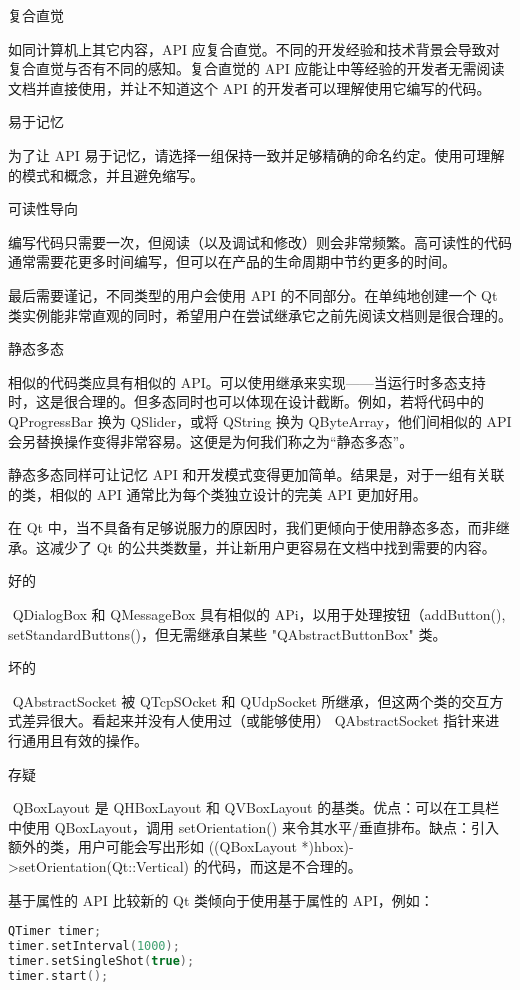 复合直觉

如同计算机上其它内容，API 应复合直觉。不同的开发经验和技术背景会导致对复合直觉与否有不同的感知。复合直觉的 API 应能让中等经验的开发者无需阅读文档并直接使用，并让不知道这个 API 的开发者可以理解使用它编写的代码。

易于记忆

为了让 API 易于记忆，请选择一组保持一致并足够精确的命名约定。使用可理解的模式和概念，并且避免缩写。

可读性导向

编写代码只需要一次，但阅读（以及调试和修改）则会非常频繁。高可读性的代码通常需要花更多时间编写，但可以在产品的生命周期中节约更多的时间。

最后需要谨记，不同类型的用户会使用 API 的不同部分。在单纯地创建一个 Qt 类实例能非常直观的同时，希望用户在尝试继承它之前先阅读文档则是很合理的。

静态多态

相似的代码类应具有相似的 API。可以使用继承来实现——当运行时多态支持时，这是很合理的。但多态同时也可以体现在设计截断。例如，若将代码中的 QProgressBar 换为 QSlider，或将 QString 换为 QByteArray，他们间相似的 API 会另替换操作变得非常容易。这便是为何我们称之为“静态多态”。

静态多态同样可让记忆 API 和开发模式变得更加简单。结果是，对于一组有关联的类，相似的 API 通常比为每个类独立设计的完美 API 更加好用。

在 Qt 中，当不具备有足够说服力的原因时，我们更倾向于使用静态多态，而非继承。这减少了 Qt 的公共类数量，并让新用户更容易在文档中找到需要的内容。

好的

​ QDialogBox 和 QMessageBox 具有相似的 APi，以用于处理按钮（addButton(), setStandardButtons()，但无需继承自某些 "QAbstractButtonBox" 类。

坏的

​ QAbstractSocket 被 QTcpSOcket 和 QUdpSocket 所继承，但这两个类的交互方式差异很大。看起来并没有人使用过（或能够使用） QAbstractSocket 指针来进行通用且有效的操作。

存疑

​ QBoxLayout 是 QHBoxLayout 和 QVBoxLayout 的基类。优点：可以在工具栏中使用 QBoxLayout，调用 setOrientation() 来令其水平/垂直排布。缺点：引入额外的类，用户可能会写出形如 ((QBoxLayout *)hbox)->setOrientation(Qt::Vertical) 的代码，而这是不合理的。

基于属性的 API
比较新的 Qt 类倾向于使用基于属性的 API，例如：

\begin{lstlisting}[language=C++]
QTimer timer;
timer.setInterval(1000);
timer.setSingleShot(true);
timer.start(); 
\end{lstlisting}

